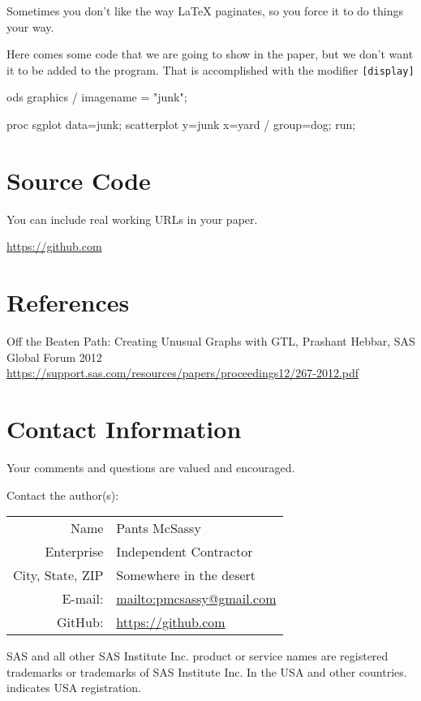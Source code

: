 \documentclass[10pt,oneside]{article}
\newcommand{\SASisRegisteredTrademark}%
           {SAS and all other SAS Institute Inc. product or service %
            names are registered trademarks or trademarks of %
            SAS Institute Inc. In the USA and other countries. %
            \textregistered\/ indicates USA registration.}
\begin{document}
Sometimes you don't like the way LaTeX paginates, so you force it to do things your way.

\newpage

Here comes some code that we are going to show in the paper, but we don't want it to be added to the program. That is accomplished with the modifier \texttt{[display]}

\begin{Sascode}[display]
ods graphics / imagename = "junk";

proc sgplot data=junk;
   scatterplot y=junk x=yard / group=dog;
run;
\end{Sascode}

\section{Source Code}

You can include real working URLs in your paper.

\url{https://github.com}

\section{References}

Off the Beaten Path: Creating Unusual Graphs with GTL, Prashant Hebbar, SAS Global Forum 2012 \\
\url{https://support.sas.com/resources/papers/proceedings12/267-2012.pdf}

\section{Contact Information}

Your comments and questions are valued and encouraged.

Contact the author(s):

\begin{tabular}[t]{rl}
Name               & Pants McSassy                    \\
Enterprise         & Independent Contractor           \\
City, State, ZIP   & Somewhere in the desert          \\
E-mail:            & \url{mailto:pmcsassy@gmail.com}  \\
GitHub:            & \url{https://github.com}         \\
\end{tabular}

\vfill
\SASisRegisteredTrademark%

\end{document}
